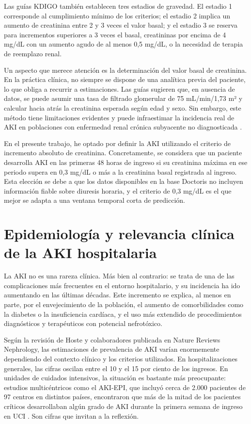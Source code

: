 \documentclass[12pt, a4paper, oneside]{report}
\begin{document}
Las guías KDIGO también establecen tres estadios de gravedad. El estadio 1 corresponde al cumplimiento mínimo de los criterios; el estadio 2 implica un aumento de creatinina entre 2 y 3 veces el valor basal; y el estadio 3 se reserva para incrementos superiores a 3 veces el basal, creatininas por encima de 4 mg/dL con un aumento agudo de al menos 0,5 mg/dL, o la necesidad de terapia de reemplazo renal.

Un aspecto que merece atención es la determinación del valor basal de creatinina. En la práctica clínica, no siempre se dispone de una analítica previa del paciente, lo que obliga a recurrir a estimaciones. Las guías sugieren que, en ausencia de datos, se puede asumir una tasa de filtrado glomerular de 75 mL/min/1,73 m² y calcular hacia atrás la creatinina esperada según edad y sexo. Sin embargo, este método tiene limitaciones evidentes y puede infraestimar la incidencia real de AKI en poblaciones con enfermedad renal crónica subyacente no diagnosticada \parencite{palevsky2013kdoqi}.

En el presente trabajo, he optado por definir la AKI utilizando el criterio de incremento absoluto de creatinina. Concretamente, se considera que un paciente desarrolla AKI en las primeras 48 horas de ingreso si su creatinina máxima en ese periodo supera en 0,3 mg/dL o más a la creatinina basal registrada al ingreso. Esta elección se debe a que los datos disponibles en la base Doctoris no incluyen información fiable sobre diuresis horaria, y el criterio de 0,3 mg/dL es el que mejor se adapta a una ventana temporal corta de predicción.

\section{Epidemiología y relevancia clínica de la AKI hospitalaria}
La AKI no es una rareza clínica. Más bien al contrario: se trata de una de las complicaciones más frecuentes en el entorno hospitalario, y su incidencia ha ido aumentando en las últimas décadas. Este incremento se explica, al menos en parte, por el envejecimiento de la población, el aumento de comorbilidades como la diabetes o la insuficiencia cardíaca, y el uso más extendido de procedimientos diagnósticos y terapéuticos con potencial nefrotóxico.

Según la revisión de Hoste y colaboradores publicada en Nature Reviews Nephrology, las estimaciones de prevalencia de AKI varían enormemente dependiendo del contexto clínico y los criterios utilizados. En hospitalizaciones generales, las cifras oscilan entre el 10 y el 15 por ciento de los ingresos. En unidades de cuidados intensivos, la situación es bastante más preocupante: estudios multicéntricos como el AKI-EPI, que incluyó cerca de 2.000 pacientes de 97 centros en distintos países, encontraron que más de la mitad de los pacientes críticos desarrollaban algún grado de AKI durante la primera semana de ingreso en UCI \parencite{hoste2015akiepi}. Son cifras que invitan a la reflexión.
\end{document}
